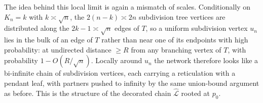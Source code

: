 \documentclass[english,11pt]{smfart}
\newcommand{\convdis}{\,{\buildrel \mathrm{d} \over \longrightarrow}\,}
\newcommand{\cL}{\mathcal{L}}
\newcommand{\mN}{\mathsf{N}}
\newtheorem{theorem}{Theorem}[section]
\numberwithin{equation}{section}
\begin{document}
The idea behind this local limit is again a mismatch of scales.
Conditionally on $K_n=k$ with $k\asymp\sqrt n$, the $2(n-k)\asymp 2n$
subdivision tree vertices are distributed along the $2k-1\asymp\sqrt n$
edges of $T$, so a uniform subdivision vertex $u_n$ lies in the bulk of an
edge of $T$ rather than near one of its endpoints with high probability:
at undirected distance $\ge R$ from any branching vertex of $T$, with
probability $1-O(R/\sqrt n)$. Locally around $u_n$ the network therefore
looks like a bi-infinite chain of subdivision vertices, each carrying a
reticulation with a pendant leaf, with partners pushed to infinity by the
same union-bound argument as before. This is the structure of the
decorated chain $\hat{\cL}$ rooted at $p_0$.


\end{document}
